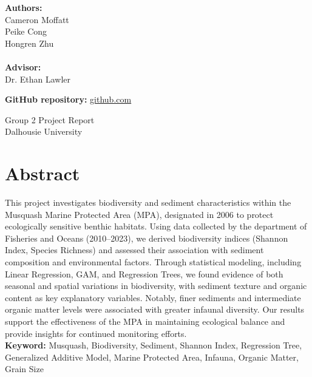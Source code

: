 \documentclass[12pt]{article}
\begin{document}
\begin{titlepage}
\vspace{2cm}
\textbf{Authors:}\\
Cameron Moffatt\\
Peike Cong\\
Hongren Zhu\\
\qquad\\
\textbf{Advisor:}\\
Dr. Ethan Lawler\\


\vspace{3 cm}


\begin{center}
\textbf{GitHub repository: } \url{github.com}
\end{center}

\vspace{3cm}
Group 2 Project Report\\
Dalhousie University

\vspace{1 cm}
\vfill
	
\end{titlepage}


\newpage
\thispagestyle{empty} %

\section*{Abstract}

\qquad This project investigates biodiversity and sediment characteristics
within the Musquash Marine Protected Area (MPA), designated in 2006 to protect
ecologically sensitive benthic habitats. Using data collected by the department
of Fisheries and Oceans (2010–2023), we derived biodiversity indices (Shannon Index,
Species Richness) and assessed their association with sediment composition and
environmental factors. Through statistical modeling, including Linear
Regression, GAM, and Regression Trees, we found evidence of both seasonal and
spatial variations in biodiversity, with sediment texture and organic content as
key explanatory variables. Notably, finer sediments and intermediate organic
matter levels were associated with greater infaunal diversity. Our results
support the effectiveness of the MPA in maintaining ecological balance and
provide insights for continued monitoring efforts.\\

\textbf{Keyword: }Musquash, Biodiversity, Sediment, Shannon Index, Regression
Tree, Generalized Additive Model, Marine Protected Area, Infauna, Organic
Matter, Grain Size
\end{document}
